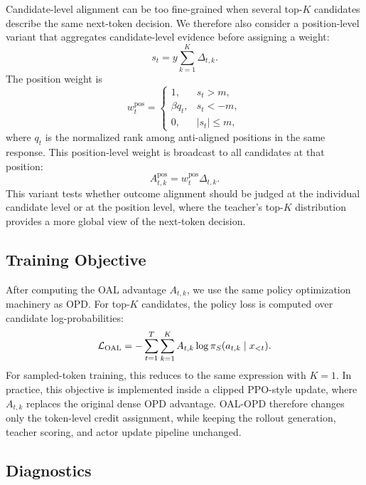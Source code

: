 \documentclass[letterpaper]{article} %
\begin{document}
Candidate-level alignment can be too fine-grained when several top-$K$ candidates describe the same next-token decision. We therefore also consider a position-level variant that aggregates candidate-level evidence before assigning a weight:
\begin{equation}
s_t
=
y \sum_{k=1}^{K}\Delta_{t,k}.
\end{equation}
The position weight is
\begin{equation}
w^{\mathrm{pos}}_t
=
\left\{
\begin{array}{ll}
1, & s_t>m,\\
\beta q_t, & s_t<-m,\\
0, & |s_t|\leq m,
\end{array}
\right.
\end{equation}
where $q_t$ is the normalized rank among anti-aligned positions in the same response. This position-level weight is broadcast to all candidates at that position:
\begin{equation}
A^{\mathrm{pos}}_{t,k}
=
w^{\mathrm{pos}}_t\Delta_{t,k}.
\end{equation}
This variant tests whether outcome alignment should be judged at the individual candidate level or at the position level, where the teacher's top-$K$ distribution provides a more global view of the next-token decision.

\subsection{Training Objective}

After computing the OAL advantage $A_{t,k}$, we use the same policy optimization machinery as OPD. For top-$K$ candidates, the policy loss is computed over candidate log-probabilities:
\begin{equation}
{\cal L}_{\mathrm{OAL}}
=
-
\sum_{t=1}^{T}\sum_{k=1}^{K}
A_{t,k}\log \pi_S(a_{t,k}\mid x_{<t}).
\end{equation}
For sampled-token training, this reduces to the same expression with $K=1$. In practice, this objective is implemented inside a clipped PPO-style update, where $A_{t,k}$ replaces the original dense OPD advantage. OAL-OPD therefore changes only the token-level credit assignment, while keeping the rollout generation, teacher scoring, and actor update pipeline unchanged.

\subsection{Diagnostics}
\end{document}
